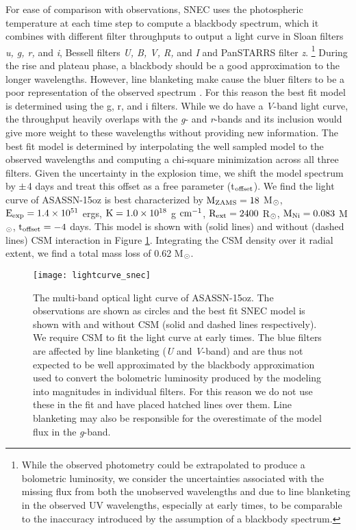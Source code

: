 \documentclass[a4paper,fleqn,usenatbib]{mnras}
\newcommand{\msunperiod}{M$\rm{_{\odot}}$}
\newcommand{\rsun}{R$\rm{_{\odot}}$}
\begin{document}
For ease of comparison with observations, SNEC uses the photospheric temperature at each time step to compute a blackbody spectrum, which it combines with different filter throughputs to output a light curve in Sloan filters {\it u, g, r,} and {\it i}, Bessell filters {\it U, B, V, R,} and {\it I} and PanSTARRS filter {\it z}. 
\footnote{While the observed photometry could be extrapolated to produce a bolometric luminosity, we consider the uncertainties associated with the missing flux from both the unobserved wavelengths and due to line blanketing in the observed UV wavelengths, especially at early times, to be comparable to the inaccuracy introduced by the assumption of a blackbody spectrum.}
During the rise and plateau phase, a blackbody should be a good approximation to the longer wavelengths. 
However, line blanketing make cause the bluer filters to be a poor representation of the observed spectrum \citep{2009kasen,2005dessart}.
For this reason the best fit model is determined using the g, r, and i filters. 
While we do have a {\it V}-band light curve, the throughput heavily overlaps with the {\it g}- and {\it r}-bands and its inclusion would give more weight to these wavelengths without providing new information.
The best fit model is determined by interpolating the well sampled model to the observed wavelengths and computing a chi-square minimization across all three filters.
Given the uncertainty in the explosion time, we shift the model spectrum by $\rm{\pm}$4 days and treat this offset as a free parameter (t$\rm{_{offset}}$).
We find the light curve of ASASSN-15oz is best characterized by $\rm{M_{ZAMS} = 18}$ \msunperiod, $\rm{E_{exp}= 1.4\times10^{51}}$ ergs, $\rm{K = 1.0\times10^{18}}$ g $\rm{cm^{-1}}$, $\rm{R_{ext} = 2400}$ \rsun, $\rm{M_{Ni} = 0.083}$  \msunperiod, $\rm{t_{offset} = -4}$ days.
This model is shown with (solid lines) and without (dashed lines) CSM interaction in Figure \ref{fig:snecLC}. 
Integrating the CSM density over it radial extent, we find a total mass loss of 0.62 \msunperiod. 
\begin{figure}
\begin{center}
\texttt{[image: lightcurve\_snec]} %
\caption{The multi-band optical light curve of ASASSN-15oz. 
The observations are shown as circles and the best fit SNEC model is shown with and without CSM (solid and dashed lines respectively).
We require CSM to fit the light curve at early times. 
The blue filters are affected by line blanketing ({\it U} and {\it V}-band) and are thus not expected to be well approximated by the blackbody approximation used to convert the bolometric luminosity produced by the modeling into magnitudes in individual filters. 
For this reason we do not use these in the fit and have placed hatched lines over them.
Line blanketing may also be responsible for the overestimate of the model flux in the {\it g}-band.}
\label{fig:snecLC}
\end{center}
\end{figure}
\end{document}
